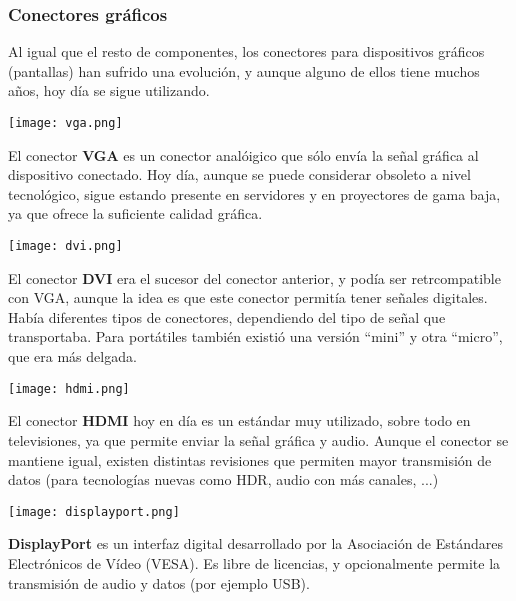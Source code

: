 \subsubsection{Conectores gráficos}
Al igual que el resto de componentes, los conectores para dispositivos gráficos (pantallas) han sufrido una evolución, y aunque alguno de ellos tiene muchos años, hoy día se sigue utilizando.

 \begin{minipage}{0.15\linewidth}
    \texttt{[image: vga.png]}
\end{minipage}
\hfill
\begin{minipage}{0.8\linewidth}
     El conector \textbf{VGA} es un conector analóigico que sólo envía la señal gráfica al dispositivo conectado. Hoy día, aunque se puede considerar obsoleto a nivel tecnológico, sigue estando presente en servidores y en proyectores de gama baja, ya que ofrece la suficiente calidad gráfica.
\end{minipage}


\vspace{12pt}
\begin{minipage}{0.15\linewidth}
   \texttt{[image: dvi.png]}
\end{minipage}
\hfill
\begin{minipage}{0.8\linewidth}
   El conector \textbf{DVI} era el sucesor del conector anterior, y podía ser retrcompatible con VGA, aunque la idea es que este conector permitía tener señales digitales. Había diferentes tipos de conectores, dependiendo del tipo de señal que transportaba. Para portátiles también existió una versión “mini” y otra “micro”, que era más delgada.
\end{minipage}


\vspace{12pt}
\begin{minipage}{0.15\linewidth}
    \texttt{[image: hdmi.png]}
\end{minipage}
\hfill
\begin{minipage}{0.8\linewidth}
    El conector \textbf{HDMI} hoy en día es un estándar muy utilizado, sobre todo en televisiones, ya que permite enviar la señal gráfica y audio. Aunque el conector se mantiene igual, existen distintas revisiones que permiten mayor transmisión de datos (para tecnologías nuevas como HDR, audio con más canales, ...)
\end{minipage}


\begin{minipage}{0.15\linewidth}
    \texttt{[image: displayport.png]}
\end{minipage}
\hfill
\begin{minipage}{0.8\linewidth}
    \textbf{DisplayPort} es un interfaz digital desarrollado por la Asociación de Estándares Electrónicos de Vídeo (VESA). Es libre de licencias, y opcionalmente permite la transmisión de audio y datos (por ejemplo USB).
\end{minipage}


